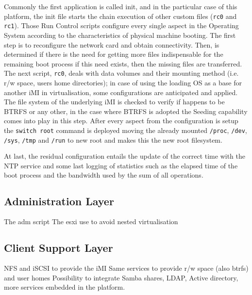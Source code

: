 Commonly the first application is called init, and in the particular case of this platform, the init file starts the chain execution of other custom files (\texttt{rc0} and \texttt{rc1}). Those Run Control scripts configure every single aspect in the Operating System according to the characteristics of physical machine booting. The first step is to reconfigure the network card and obtain connectivity. Then, is determined if there is the need for getting more files indispensable for the remaining boot process if this need exists, then the missing files are transferred. The next script, \texttt{rc0}, deals with data volumes and their mounting method (i.e. r/w space, users home directories); in case of using the loading OS as a base for another iMI in virtualisation, some configurations are anticipated and applied. The file system of the underlying iMI is checked to verify if happens to be BTRFS or any other, in the case where BTRFS is adopted the Seeding capability comes into play in this step. After every aspect from the configuration is setup the \texttt{switch root} command is deployed moving the already mounted \texttt{/proc}, \texttt{/dev}, \texttt{/sys}, \texttt{/tmp} and \texttt{/run} to new root and makes this the new root filesystem.

At last, the residual configuration entails the update of the correct time with the NTP service and some last logging of statistics such as the elapsed time of the boot process and the bandwidth used by the sum of all operations.



\subsection{Administration Layer}
\label{sub:icbd_architecture_adm}

The adm script
The esxi use to avoid nested virtualisation


\subsection{Client Support Layer}
\label{sub:icbd_architecture_client}

NFS and iSCSI to provide the iMI
Same services to provide r/w space (also btrfs) and user homes
Possibility to integrate Samba shares, LDAP, Active directory, more services embedded in the platform.

